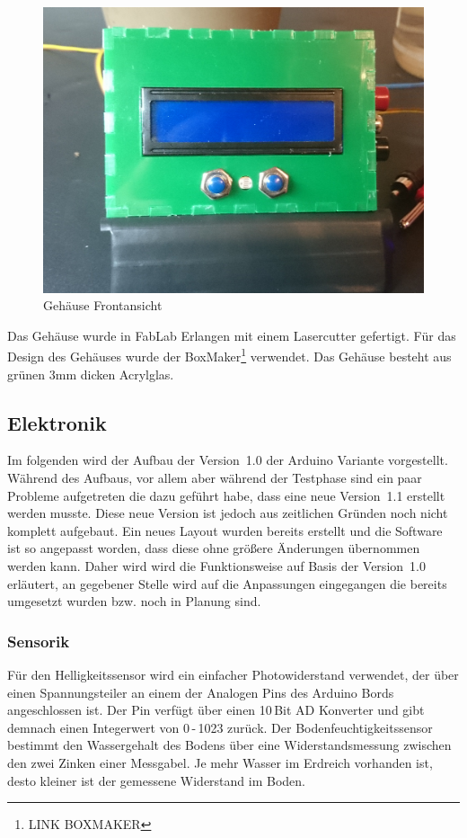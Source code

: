 ﻿\documentclass[]{IEEEtran}
\begin{document}
	\begin{figure}[!h]
	\includegraphics[width=0.8\linewidth]{bilder/_boxFron1.jpg}	
	\caption{Gehäuse Frontansicht}
	\label{fig-Gehäuse}
	\end{figure}
	
Das Gehäuse wurde in FabLab Erlangen mit einem Lasercutter gefertigt. Für das Design des Gehäuses wurde der BoxMaker\footnote{LINK BOXMAKER} verwendet. Das Gehäuse besteht aus grünen 3mm dicken Acrylglas.
	

	

\subsection{Elektronik}
	Im folgenden wird der Aufbau der Version~1.0 der Arduino Variante vorgestellt. Während des Aufbaus, vor allem aber während der Testphase sind ein paar Probleme aufgetreten die dazu geführt habe, dass eine neue Version~1.1 erstellt werden musste. Diese neue Version ist jedoch aus zeitlichen Gründen noch nicht komplett aufgebaut. Ein neues Layout wurden bereits erstellt und die Software ist so angepasst worden, dass diese ohne größere Änderungen übernommen werden kann. Daher wird wird die Funktionsweise auf Basis der Version~1.0 erläutert, an gegebener Stelle wird auf die Anpassungen eingegangen die bereits umgesetzt wurden bzw. noch in Planung sind. 

			
\subsubsection{Sensorik} \label{sensorik}
Für den Helligkeitssensor wird ein einfacher Photowiderstand verwendet, der über einen Spannungsteiler an einem der Analogen Pins des Arduino Bords angeschlossen ist. Der Pin verfügt über einen 10\,Bit AD Konverter und gibt demnach einen Integerwert von 
0\,-\,1023 zurück.
Der Bodenfeuchtigkeitssensor bestimmt den Wassergehalt des Bodens über eine Widerstandsmessung zwischen den zwei Zinken einer Messgabel. Je mehr Wasser im Erdreich vorhanden ist, desto kleiner ist der gemessene Widerstand im Boden.
\end{document}
